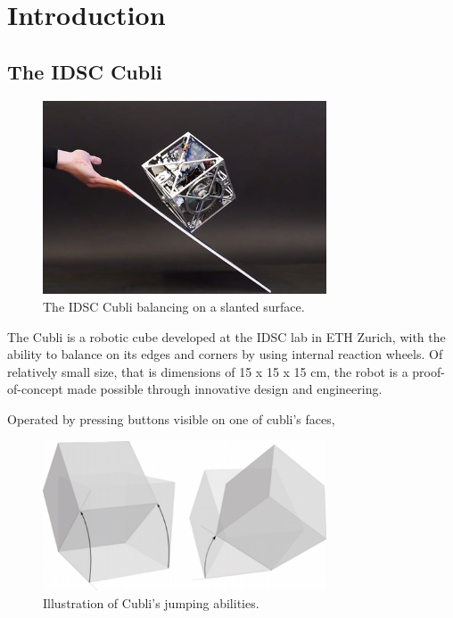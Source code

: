 \chapter{Introduction}\label{sec:introduction}

\section{The IDSC Cubli}\label{sec:cubli}

\begin{figure}[ht]
   \centering
   \includegraphics[width=0.75\textwidth]{img/Cubli.jpg}
   \caption{The IDSC Cubli balancing on a slanted surface.}
   \label{img:Cubli}
\end{figure}

The Cubli is a robotic cube developed at the IDSC lab in ETH Zurich, with the ability to balance on its edges and corners by using internal reaction wheels. Of relatively small size, that is dimensions of 15 x 15 x 15 cm, the robot is a proof-of-concept made possible through innovative design and engineering.

Operated by pressing buttons visible on one of cubli's faces,

\begin{figure}[ht]
   \centering
   \includegraphics[width=0.75\textwidth]{img/Jumps.png}
   \caption{Illustration of Cubli's jumping abilities.}
   \label{img:Jumps}
\end{figure}